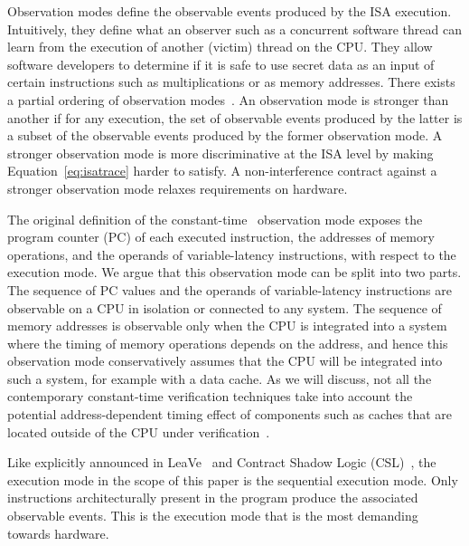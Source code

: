 Observation modes define the observable events produced by the ISA execution.
Intuitively, they define what an observer such as a concurrent software thread can learn from the execution of another (victim) thread on the CPU.
They allow software developers to determine if it is safe to use secret data as an input of certain instructions such as multiplications or as memory addresses.
There exists a partial ordering of observation modes~\cite{guarnieri2021hardware}.
An observation mode is stronger than another if for any execution, the set of observable events produced by the latter is a subset of the observable events produced by the former observation mode. 
A stronger observation mode is more discriminative at the ISA level by making Equation~\ref{eq:isatrace} harder to satisfy.
A non-interference contract against a stronger observation mode relaxes requirements on hardware.

The original definition of the constant-time~\cite{guarnieri2021hardware} observation mode exposes the program counter (PC) of each executed instruction, the addresses of memory operations, and the operands of variable-latency instructions, with respect to the execution mode.
We argue that this observation mode can be split into two parts.
The sequence of PC values and the operands of variable-latency instructions are observable on a CPU in isolation or connected to any system.
The sequence of memory addresses is observable only when the CPU is integrated into a system where the timing of memory operations depends on the address, and hence this observation mode conservatively assumes that the CPU will be integrated into such a system, for example with a data cache.
As we will discuss, not all the contemporary constant-time verification techniques take into account the potential address-dependent timing effect of components such as caches that are located outside of the CPU under verification~\cite{ceesay2024mucfi,dinesh2024conjunct,dinesh2025h}.

Like explicitly announced in LeaVe~\cite{wang2023specification} and Contract Shadow Logic (CSL)~\cite{tan2025contractshadowlogic}, the execution mode in the scope of this paper is the sequential execution mode.
Only instructions architecturally present in the program produce the associated observable events.
This is the execution mode that is the most demanding towards hardware.

